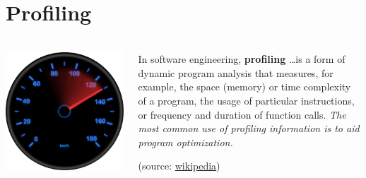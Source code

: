 \documentclass[9pt,xcolor=table]{beamer}
\begin{document}
\section{Profiling}
\begin{frame}
\frametitle{\insertsectionhead{}}
\begin{columns}[c]
  \begin{column}{.4\textwidth}
    \begin{center}
      \includegraphics[width=.8\textwidth]{img/kmh_speedometer}
    \end{center}
    \end{column}
    \begin{column}{.55\textwidth}
      In software engineering, \textbf{profiling} \dots is a form of dynamic program analysis that \alert{measures}, for example, the space (memory) or time complexity of a program, the usage of particular instructions, or frequency and duration of function calls. \textit{The most common use of profiling information is to aid program optimization.}
      \begin{flushright}
        \small(source: \href{http://en.wikipedia.org/wiki/Profiling_(computer_programming)}{wikipedia})
      \end{flushright}
    \end{column}
  \end{columns}
\end{frame}
\end{document}
